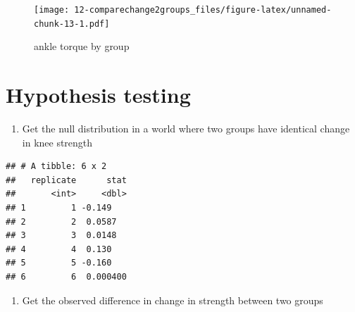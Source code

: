 \documentclass[
]{book}
\newenvironment{Shaded}{\begin{snugshade}}{\end{snugshade}}
\newcommand{\DataTypeTok}[1]{\textcolor[rgb]{0.13,0.29,0.53}{#1}}
\newcommand{\DecValTok}[1]{\textcolor[rgb]{0.00,0.00,0.81}{#1}}
\newcommand{\KeywordTok}[1]{\textcolor[rgb]{0.13,0.29,0.53}{\textbf{#1}}}
\newcommand{\NormalTok}[1]{#1}
\newcommand{\OperatorTok}[1]{\textcolor[rgb]{0.81,0.36,0.00}{\textbf{#1}}}
\newcommand{\StringTok}[1]{\textcolor[rgb]{0.31,0.60,0.02}{#1}}
\providecommand{\tightlist}{%
  \setlength{\itemsep}{0pt}\setlength{\parskip}{0pt}}
\begin{document}
\begin{figure}
\centering
\texttt{[image: 12-comparechange2groups\_files/figure-latex/unnamed-chunk-13-1.pdf]}
\caption{\label{fig:unnamed-chunk-13}ankle torque by group}
\end{figure}

\hypertarget{hypothesis-testing}{%
\section{Hypothesis testing}\label{hypothesis-testing}}

\begin{enumerate}
\def\labelenumi{\arabic{enumi}.}
\tightlist
\item
  Get the null distribution in a world where two groups have identical change in knee strength
\end{enumerate}

\begin{Shaded}
\end{Shaded}

\begin{verbatim}
## # A tibble: 6 x 2
##   replicate      stat
##       <int>     <dbl>
## 1         1 -0.149   
## 2         2  0.0587  
## 3         3  0.0148  
## 4         4  0.130   
## 5         5 -0.160   
## 6         6  0.000400
\end{verbatim}

\begin{enumerate}
\def\labelenumi{\arabic{enumi}.}
\setcounter{enumi}{1}
\tightlist
\item
  Get the observed difference in change in strength between two groups
\end{enumerate}
\end{document}
